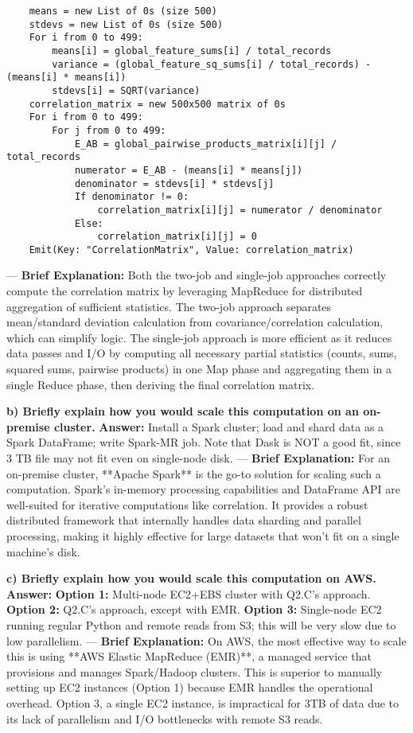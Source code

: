 \documentclass{article}
\begin{document}
\begin{enumerate}[label=\textbf{Question \arabic*.}]
\begin{enumerate}[label=(\alph*)]
\begin{lstlisting}
    means = new List of 0s (size 500)
    stdevs = new List of 0s (size 500)
    For i from 0 to 499:
        means[i] = global_feature_sums[i] / total_records
        variance = (global_feature_sq_sums[i] / total_records) - (means[i] * means[i])
        stdevs[i] = SQRT(variance)
    correlation_matrix = new 500x500 matrix of 0s
    For i from 0 to 499:
        For j from 0 to 499:
            E_AB = global_pairwise_products_matrix[i][j] / total_records
            numerator = E_AB - (means[i] * means[j])
            denominator = stdevs[i] * stdevs[j]
            If denominator != 0:
                correlation_matrix[i][j] = numerator / denominator
            Else:
                correlation_matrix[i][j] = 0
    Emit(Key: "CorrelationMatrix", Value: correlation_matrix)
        \end{lstlisting}
    \end{enumerate}
    ---
    \textbf{Brief Explanation:} Both the two-job and single-job approaches correctly compute the correlation matrix by leveraging MapReduce for distributed aggregation of sufficient statistics. The two-job approach separates mean/standard deviation calculation from covariance/correlation calculation, which can simplify logic. The single-job approach is more efficient as it reduces data passes and I/O by computing all necessary partial statistics (counts, sums, squared sums, pairwise products) in one Map phase and aggregating them in a single Reduce phase, then deriving the final correlation matrix.

  \textbf{b) Briefly explain how you would scale this computation on an on-premise cluster.}
    \textbf{Answer:}
    Install a Spark cluster; load and shard data as a Spark DataFrame; write Spark-MR job. Note that Dask is NOT a good fit, since 3 TB file may not fit even on single-node disk.
    ---
    \textbf{Brief Explanation:} For an on-premise cluster, **Apache Spark** is the go-to solution for scaling such a computation. Spark's in-memory processing capabilities and DataFrame API are well-suited for iterative computations like correlation. It provides a robust distributed framework that internally handles data sharding and parallel processing, making it highly effective for large datasets that won't fit on a single machine's disk.

  \textbf{c) Briefly explain how you would scale this computation on AWS.}
    \textbf{Answer:}
    \textbf{Option 1:} Multi-node EC2+EBS cluster with Q2.C's approach.
    \textbf{Option 2:} Q2.C's approach, except with EMR.
    \textbf{Option 3:} Single-node EC2 running regular Python and remote reads from S3; this will be very slow due to low parallelism.
    ---
    \textbf{Brief Explanation:} On AWS, the most effective way to scale this is using **AWS Elastic MapReduce (EMR)**, a managed service that provisions and manages Spark/Hadoop clusters. This is superior to manually setting up EC2 instances (Option 1) because EMR handles the operational overhead. Option 3, a single EC2 instance, is impractical for 3TB of data due to its lack of parallelism and I/O bottlenecks with remote S3 reads.


\end{enumerate}
\end{document}
